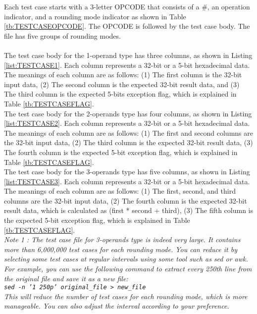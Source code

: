 \begin{description}
Each test case starts with a 3-letter OPCODE that consists of a \#, an operation indicator, and a rounding mode indicator as shown in Table \ref{tb:TESTCASEOPCODE}. The OPCODE is followed by the test case body. The file has five groups of rounding modes.\\\\

The test case body for the 1-operand type has three columns, as shown in Listing \ref{list:TESTCASE1}. Each column represents a 32-bit or a 5-bit hexadecimal data. The meanings of each column are as follows: (1) The first column is the 32-bit input data, (2) The second column is the expected 32-bit result data, and (3) The third column is the expected 5-bits exception flag, which is explained in Table \ref{tb:TESTCASEFLAG}.\\

The test case body for the 2-operands type has four columns, as shown in Listing \ref{list:TESTCASE2}. Each column represents a 32-bit or a 5-bit hexadecimal data. The meanings of each column are as follows: (1) The first and second columns are the 32-bit input data, (2) The third column is the expected 32-bit result data, (3) The fourth column is the expected 5-bit exception flag, which is explained in Table \ref{tb:TESTCASEFLAG}.\\

The test case body for the 3-operands type has five columns, as shown in Listing \ref{list:TESTCASE3}. Each column represents a 32-bit or a 5-bit hexadecimal data. The meanings of each column are as follows: (1) The first, second, and third columns are the 32-bit input data, (2) The fourth column is the expected 32-bit result data, which is calculated as (first * second + third), (3) The fifth column is the expected 5-bit exception flag, which is explained in Table \ref{tb:TESTCASEFLAG}.\\


\it{Note 1 : The test case file for 3-operands type is indeed very large. It contains more than 6,000,000 test cases for each rounding mode. You can reduce it by selecting some test cases at regular intervals using some tool such as sed or awk. For example, you can use the following command to extract every 250th line from the original file and save it as a new file:\\
\texttt{sed -n '1~250p' original\_file > new\_file}\\
This will reduce the number of test cases for each rounding mode, which is more manageable. You can also adjust the interval according to your preference.}\rm{}\\


\end{description}
